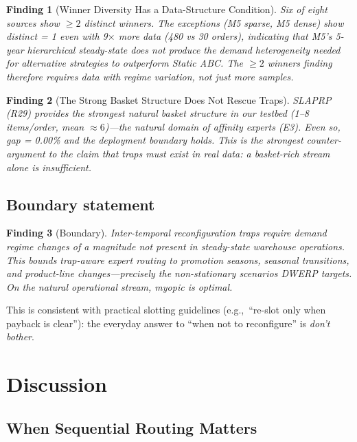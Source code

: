 \documentclass[11pt,a4paper]{article}
\newtheorem{finding}{Finding}
\newcommand{\eg}{e.g.,\ }
\begin{document}
\begin{finding}[Winner Diversity Has a Data-Structure Condition]
Six of eight sources show $\geq 2$ distinct winners. The exceptions (M5
sparse, M5 dense) show distinct = 1 even with 9$\times$ more data
(480 vs 30 orders), indicating that M5's 5-year hierarchical
steady-state does not produce the demand heterogeneity needed for
alternative strategies to outperform Static ABC. The $\geq 2$ winners
finding therefore requires data with regime variation, not just more
samples.
\end{finding}

\begin{finding}[The Strong Basket Structure Does Not Rescue Traps]
SLAPRP (R29) provides the strongest natural basket structure in our
testbed (1--8 items/order, mean $\approx 6$)---the natural domain of
affinity experts (E3). Even so, gap = 0.00\% and the deployment boundary
holds. This is the strongest counter-argument to the claim that traps
must exist in real data: a basket-rich stream alone is insufficient.
\end{finding}

\subsection{Boundary statement}

\begin{finding}[Boundary]
Inter-temporal reconfiguration traps require demand regime changes of a
magnitude not present in steady-state warehouse operations. This bounds
trap-aware expert routing to promotion seasons, seasonal transitions,
and product-line changes---precisely the non-stationary scenarios DWERP
targets. On the natural operational stream, myopic is optimal.
\end{finding}

This is consistent with practical slotting guidelines (\eg ``re-slot only
when payback is clear''): the everyday answer to ``when not to
reconfigure'' is \emph{don't bother}.

\section{Discussion}\label{sec:discussion}

\subsection{When Sequential Routing Matters}
\end{document}
